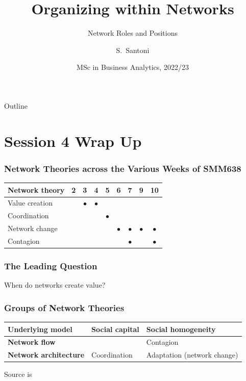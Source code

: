 \documentclass[notes, aspectratio=1610]{beamer}
\title[Orgnazing within Networks]
{Organizing within Networks}
\subtitle{Network Roles and Positions}
\author{S.~Santoni\inst{1}\inst{2}}
\institute{
	\inst{1}%
	Bayes Business School
	\and
	\inst{2}%
	Soundcloud
	}
\date{MSc in Business Analytics, 2022/23}
\begin{document}
\begin{frame}
	\titlepage
\end{frame}

\begin{frame}{Outline}
	\tableofcontents
\end{frame}

\section{Session 4 Wrap Up}

\begin{frame}
	\frametitle{Network Theories across the Various Weeks of SMM638}
	\begin{table}
		\begin{tabular}[c]{l|c|c|c|c|c|c|c|c}
			\textbf{Network theory} & 
			\textbf{2} & 
			\textbf{3} & 
			\textbf{4} & 
			\textbf{5} & 
			\textbf{6} & 
			\textbf{7} & 
			\textbf{9} & 
			\textbf{10}\\
			\hline
			Value creation &  & $\bullet$ & $\bullet$ &  &  &  &  & \\	
			Coordination &  &  &  & $\bullet$ &  &  &  & \\	
			Network change &  &  &  &  & $\bullet$ & $\bullet$ & $\bullet$ & $\bullet$\\	
			Contagion &  &  &  &  &  & $\bullet$ &  & $\bullet$ \\	
		\end{tabular}
	\end{table}
\end{frame}

\begin{frame}
	\frametitle{The Leading Question}
		\begin{center}
			\Large When do networks create value?
		\end{center}
\end{frame}

\begin{frame}
	\frametitle{Groups of Network Theories}
	\centering
	\small
	\begin{table}
		\begin{center}
			\begin{tabular}[c]{l|l|l}
				\textbf{Underlying model} & 
				\textbf{Social capital} &
				\textbf{Social homogeneity}\\
				\hline
				\textbf{Network flow} & \cellcolor{blue!20}{\color{black}{Capitalization (value creation)}} & Contagion  \\
				\hline
				\textbf{Network architecture} & Coordination & Adaptation  (network change)\\
			\end{tabular}
		\end{center}
	\end{table}

	\vspace{1em}

	\raggedright \small Source is~\cite[][page 47]{scott2011}
\end{frame}
\end{document}
